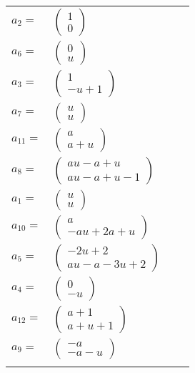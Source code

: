 \documentclass[1p]{elsarticle_modified}
\theoremstyle{definition}
\begin{document}
\begin{tabular}{m{7pt} m{180pt} m{7pt} m{180pt} }
\flushright $a_{2}=$&$\begin{pmatrix}1\\0\end{pmatrix}$ \\
\flushright $a_{6}=$&$\begin{pmatrix}0\\u\end{pmatrix}$ \\
\flushright $a_{3}=$&$\begin{pmatrix}1\\- u+1\end{pmatrix}$ \\
\flushright $a_{7}=$&$\begin{pmatrix}u\\u\end{pmatrix}$ \\
\flushright $a_{11}=$&$\begin{pmatrix}a\\a+u\end{pmatrix}$ \\
\flushright $a_{8}=$&$\begin{pmatrix}a u- a+u\\a u- a+u-1\end{pmatrix}$ \\
\flushright $a_{1}=$&$\begin{pmatrix}u\\u\end{pmatrix}$ \\
\flushright $a_{10}=$&$\begin{pmatrix}a\\- a u+2 a+u\end{pmatrix}$ \\
\flushright $a_{5}=$&$\begin{pmatrix}-2 u+2\\a u- a-3 u+2\end{pmatrix}$ \\
\flushright $a_{4}=$&$\begin{pmatrix}0\\- u\end{pmatrix}$ \\
\flushright $a_{12}=$&$\begin{pmatrix}a+1\\a+u+1\end{pmatrix}$ \\
\flushright $a_{9}=$&$\begin{pmatrix}- a\\- a- u\end{pmatrix}$\\&\end{tabular}
\end{document}
